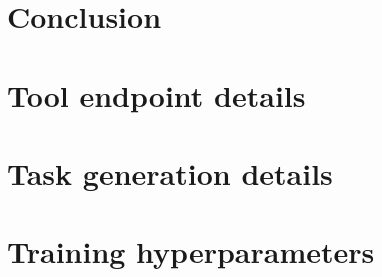 \documentclass{article}
\begin{document}
%
%


\section{Conclusion}
\label{sec:conclusion}








\appendix

\section{Tool endpoint details}

\section{Task generation details}

\section{Training hyperparameters}


\newpage

\end{document}
